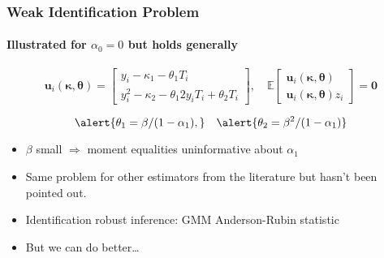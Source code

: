 \documentclass{beamer}
\begin{document}
%
%
\begin{frame}[plain,c]

  \begin{figure}[h]
    \centering
  \end{figure}

\end{frame}
\begin{frame}[plain,c]

  \begin{figure}[h]
    \centering
  \end{figure}

\end{frame}
\begin{frame}[plain,c]

  \begin{figure}[h]
    \centering
  \end{figure}

\end{frame}
\begin{frame}
  \frametitle{Weak Identification Problem}
  \framesubtitle{Illustrated for $\alpha_0 = 0$ but holds generally}

  \small
\[
  \mathbf{u}_i(\boldsymbol{\kappa}, \boldsymbol{\theta}) = \left[
  \begin{array}{l}
  y_i - \kappa_1 - \theta_1 T_i\\
  y^2_i - \kappa_2  - \theta_1 2y_iT_i + \theta_2 T_i
  \end{array}
\right], \quad
 \mathbb{E}
  \left[
  \begin{array}{l}
    \boldsymbol{u}_i(\boldsymbol{\kappa}, \boldsymbol{\theta}) \\ \mathbf{u}_i(\boldsymbol{\kappa}, \boldsymbol{\theta}) z_i
  \end{array}
\right] = \mathbf{0}
\]

\[
  \alert{\theta_1 = \beta / (1 - \alpha_1),} \quad
  \alert{\theta_2 = \beta^2 / (1 - \alpha_1)}
\] 

\begin{itemize}
  \item $\beta$ small $\Rightarrow$ moment equalities uninformative about $\alpha_1$
  \item Same problem for other estimators from the literature but hasn't been pointed out.
  \item Identification robust inference: GMM Anderson-Rubin statistic
  \item \alert{But we can do better\ldots}
\end{itemize}


\end{frame}
\end{document}
